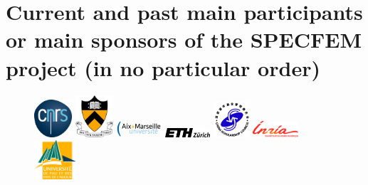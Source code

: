 \documentclass[oneside,english]{book}
\begin{document}
\section*{Current and past main participants or main sponsors of the SPECFEM project (in no particular order)}
%
\begin{figure}[htbp]
\noindent \begin{centering}
\includegraphics[width=0.125\textwidth]{figures/logo_cnrs}\vspace*{2truemm}
\includegraphics[width=0.125\textwidth]{figures/logo_princeton}\vspace*{2truemm}
\includegraphics[width=0.15\textwidth]{figures/logo_aix_marseille_universite}\vspace*{0.02truemm}
\includegraphics[width=0.15\textwidth]{figures/logo_ETH}\vspace*{2truemm}
\includegraphics[width=0.12\textwidth]{figures/logo_CSC_China}\vspace*{0.02truemm}
\includegraphics[width=0.15\textwidth]{figures/logo_inria}\vspace*{2truemm}
\includegraphics[width=0.14\textwidth]{figures/logo_UPPA}
\par\end{centering}
%

\end{figure}
\end{document}

